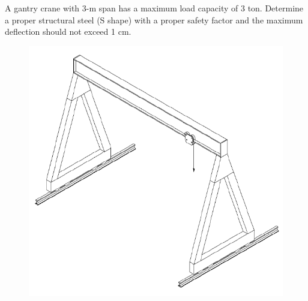 \documentclass[
10pt,
a4paper,
openany,
svgnames,
]{book}
\begin{document}
\begin{example}
  A gantry crane with 3-m span has a maximum load capacity of 3 ton. Determine a proper structural steel (S shape) with a proper safety factor and the maximum deflection should not exceed 1 cm.

  \begin{figure}[H]
    \centering
    \includegraphics[scale=0.55]{pictures/Simple-load-bearing/gantry-crane}
  \end{figure}
\end{example}
\end{document}
